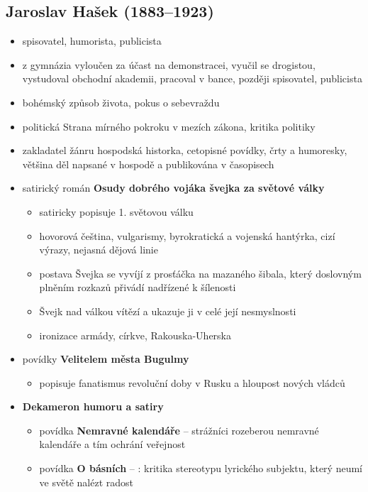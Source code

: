 \subsection{Jaroslav Hašek (1883--1923)}
\begin{itemize}
\item spisovatel, humorista, publicista
\item z gymnázia vyloučen za účast na demonstracei, vyučil se drogistou, vystudoval obchodní akademii, pracoval v bance, později spisovatel, publicista
\item bohémský způsob života, pokus o sebevraždu
\item politická Strana mírného pokroku v mezích zákona, kritika politiky
\item zakladatel žánru hospodská historka, cetopisné povídky, črty a humoresky, většina děl napsané v hospodě a publikována v časopisech
\item satirický román \textbf{Osudy dobrého vojáka švejka za světové války}
	\begin{itemize}
	\item satiricky popisuje 1. světovou válku
	\item hovorová čeština, vulgarismy, byrokratická a vojenská hantýrka, cizí výrazy, 
	\iem nejasná dějová linie
	\item postava Švejka se vyvíjí z prosťáčka na mazaného šibala, který doslovným plněním rozkazů přivádí nadřízené k šílenosti
	\item Švejk nad válkou vítězí a ukazuje ji v celé její nesmyslnosti
	\item ironizace armády, církve, Rakouska-Uherska
	\end{itemize}
\item povídky \textbf{Velitelem města Bugulmy}
	\begin{itemize}
	\item popisuje fanatismus revoluční doby v Rusku a hloupost nových vládců
	\end{itemize}
\item \textbf{Dekameron humoru a satiry}
	\begin{itemize}
	\item povídka \textbf{Nemravné kalendáře} -- strážníci rozeberou nemravné kalendáře a tím ochrání veřejnost

	\item povídka \textbf{O básních} -- : kritika stereotypu lyrického subjektu, který neumí ve světě nalézt radost
	\end{itemize}
\end{itemize}

